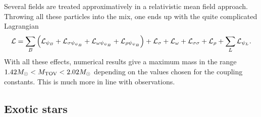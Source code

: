 Several fields are treated approximatively in a relativistic mean field approach.
Throwing all these particles into the mix, one ends up with the quite complicated Lagrangian
\begin{equation}
\begin{split}
	\mathcal{L} &= \sum_B \left( \mathcal{L}_{\psi_B} + \mathcal{L}_{\sigma \psi_{\psi_B}} + \mathcal{L}_{\omega \psi_{\psi_B}} + \mathcal{L}_{\rho \psi_{\psi_B}} \right) + \mathcal{L}_\sigma + \mathcal{L}_\omega + \mathcal{L}_{\sigma \sigma} + \mathcal{L}_\rho + \sum_L \mathcal{L}_{\psi_L} . \\
\end{split}
\end{equation}
With all these effects, numerical results give a maximum mass in the range $1.42 M_\odot < M_\text{TOV} < 2.02 M_\odot$ depending on the values chosen for the coupling constants. \cite[table 1]{ref:neutron_star_hyperon_effect}
This is much more in line with observations.

\iffalse
\subsubsection{Charge neutrality}

Multiple particles may in general have charge, in contrast to neutrons.
Stars are neutral: if it is charged, then particles of the same signed charge as the star are kicked out due to strong Coulomb force relative to weak gravitational force (can show quantitatively).
This argument means \emph{global} charge neutrality, but it is more common, easier and has little effect to instead assume \emph{local} charge neutrality.
\fi

\subsection*{Exotic stars}

